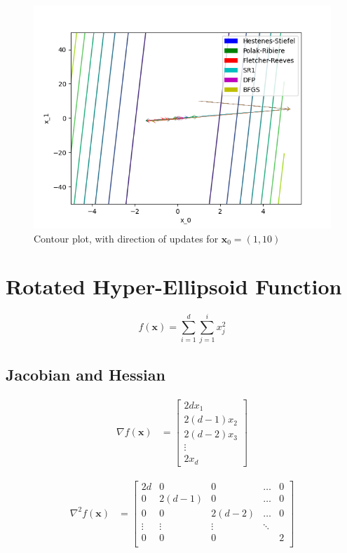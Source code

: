\documentclass[a4paper]{article}
\begin{document}
\begin{figure}[H]
    \centering
    \includegraphics[width=.65\textwidth]{images/matyas_function_cont.png}
    \caption{Contour plot, with direction of updates for $\textbf{x}_0 = (1, 10)$}
\end{figure}

\section{Rotated Hyper-Ellipsoid Function}

$$f(\textbf{x}) = \sum_{i=1}^d \sum_{j=1}^i x_j^2$$

\subsection{Jacobian and Hessian}

\begin{align*}
\nabla f(\textbf{x}) &=
    \begin{bmatrix}
        2d x_1 \\
        2(d - 1) x_2 \\
        2(d - 2) x_3 \\
        \vdots \\
        2 x_d
    \end{bmatrix}
\end{align*}

\begin{align*}
\nabla^2 f(\textbf{x}) &=
    \begin{bmatrix}
        2d & 0 & 0 & \dots & 0 \\
        0 & 2(d - 1) & 0 & \dots & 0 \\
        0 & 0 & 2(d - 2) & \dots & 0 \\
        \vdots & \vdots & \vdots & \ddots & \\
        0 & 0 & 0 & & 2 \\
    \end{bmatrix}
\end{align*}
\end{document}
